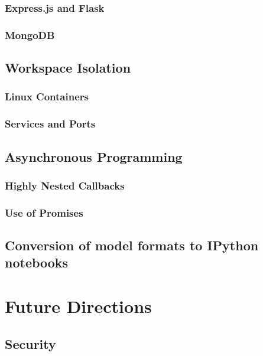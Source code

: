 \subsubsection{Express.js and Flask}
\subsubsection{MongoDB}
\subsection{Workspace Isolation}
\subsubsection{Linux Containers}
\subsubsection{Services and Ports}
\subsection{Asynchronous Programming}
\subsubsection{Highly Nested Callbacks}
\subsubsection{Use of Promises}
\subsection{Conversion of model formats to IPython notebooks}

\section{Future Directions}
\subsection{Security}
